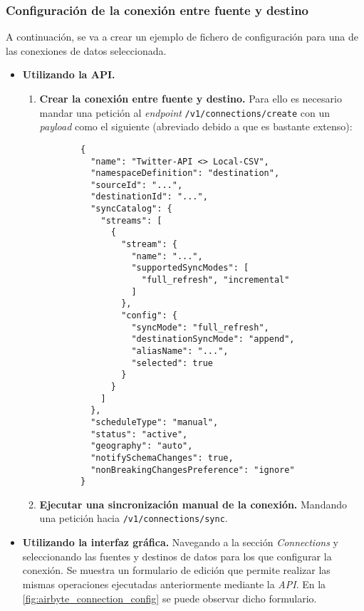 \subsubsection{Configuración de la conexión entre fuente y destino}

A continuación, se va a crear un ejemplo de fichero de configuración para una de las conexiones de datos seleccionada.

\begin{itemize}
    
    \item \textbf{Utilizando la API.}
    
    \begin{enumerate}
        
        \item \textbf{Crear la conexión entre fuente y destino.} Para ello es necesario mandar una petición al \textit{endpoint} \verb|/v1/connections/create| con un \textit{payload} como el siguiente (abreviado debido a que es bastante extenso):

        \begin{verbatim}
        {
          "name": "Twitter-API <> Local-CSV",
          "namespaceDefinition": "destination",
          "sourceId": "...",
          "destinationId": "...",
          "syncCatalog": {
            "streams": [
              {
                "stream": {
                  "name": "...",
                  "supportedSyncModes": [
                    "full_refresh", "incremental"
                  ]
                },
                "config": {
                  "syncMode": "full_refresh",
                  "destinationSyncMode": "append",
                  "aliasName": "...",
                  "selected": true
                }
              }
            ]
          },
          "scheduleType": "manual",
          "status": "active",
          "geography": "auto",
          "notifySchemaChanges": true,
          "nonBreakingChangesPreference": "ignore"
        }
        \end{verbatim}
        
        \item \textbf{Ejecutar una sincronización manual de la conexión.} Mandando una petición hacia \verb|/v1/connections/sync|.
    
    \end{enumerate}
    
    \item \textbf{Utilizando la interfaz gráfica.} Navegando a la sección \textit{Connections} y seleccionando las fuentes y destinos de datos para los que configurar la conexión. Se muestra un formulario de edición que permite realizar las mismas operaciones ejecutadas anteriormente mediante la \textit{API}. En la \autoref{fig:airbyte_connection_config} se puede observar dicho formulario.

    
\end{itemize}


